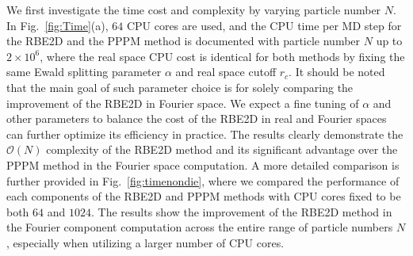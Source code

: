 We first investigate the time cost and complexity by varying particle number $N$. 
In Fig.~\ref{fig:Time}(a), $64$ CPU cores are used, and the  CPU time per MD step for the RBE2D  {and the PPPM method} is documented with particle number $N$ up to $2\times 10^6$, where  {the real space CPU cost is identical for both methods by fixing the same Ewald splitting parameter $\alpha$ and real space cutoff $r_c$}.
 {It should be noted that the main goal of such parameter choice is for solely comparing the improvement of the RBE2D in Fourier space. We expect a fine tuning of $\alpha$ and other parameters to balance the cost of the RBE2D in real and Fourier spaces can further optimize its efficiency in practice.}
The results clearly  {demonstrate} the $\mathcal{O}(N)$ complexity of the RBE2D method  {and its significant advantage over the PPPM method in the Fourier space computation.}
 {A more detailed comparison is further provided in Fig.~\ref{fig:timenondie}, where we compared the performance of each components of the RBE2D and PPPM methods with CPU cores fixed to be both $64$ and $1024$. The results show the improvement of the RBE2D method in the Fourier component computation across the entire range of particle numbers $N$, especially when utilizing a larger number of CPU cores.} %



